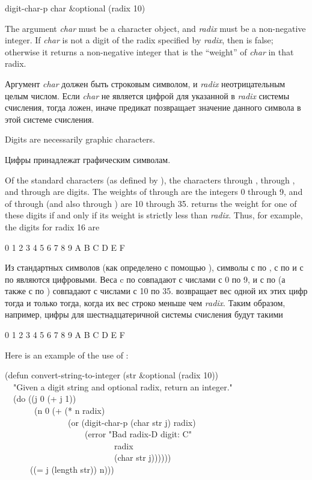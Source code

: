 \begin{defun}[Function]
digit-char-p char &optional (radix 10)

The argument \emph{char} must be a character object,
and \emph{radix} must be a non-negative integer.
If \emph{char} is not a digit of the radix
specified by \emph{radix}, then  is
false; otherwise it returns
a non-negative integer that is the ``weight'' of \emph{char} in that radix.

Аргумент \emph{char} должен быть строковым символом, и \emph{radix}
неотрицательным целым числом.
Если \emph{char} не является цифрой для указанной в \emph{radix} системы
счисления, тогда  ложен, иначе предикат позвращает значение
данного символа в этой системе счисления.

Digits are necessarily graphic characters.

Цифры принадлежат графическим символам.

Of the standard characters (as defined by ),
the characters  through ,  through ,
and  through 
are digits.  The weights of  through  are the integers 0 through 9,
and of  through  (and also  through ) are 10 through 35.
 returns the weight for one of these digits if and only if
its weight is strictly less than \emph{radix}.  Thus, for example,
the digits for radix 16 are
\begin{lisp}
0  1  2  3  4  5  6  7  8  9  A  B  C  D  E  F
\end{lisp}

Из стандартных символов (как определено с помощью ),
символы с  по , с  по  и с  по  являются
цифровыми. Веса c  по  совпадают с числами с 0 по 9, и с  по
 (а также с  по ) совпадают с числами с 10 по 35.
 возвращает вес одной их этих цифр тогда и только тогда, когда
их вес строко меньше чем \emph{radix}. Таким образом, например, цифры для
шестнадцатеричной системы счисления будут такими
\begin{lisp}
0  1  2  3  4  5  6  7  8  9  A  B  C  D  E  F
\end{lisp}

Here is an example of the use of :
\begin{lisp}
(defun convert-string-to-integer (str \&optional (radix 10)) \\
~~"Given a digit string and optional radix, return an integer." \\
~~(do ((j 0 (+ j 1)) \\
~~~~~~~(n 0 (+ (* n radix) \\
~~~~~~~~~~~~~~~(or (digit-char-p (char str j) radix) \\
~~~~~~~~~~~~~~~~~~~(error "Bad radix-{\Xtilde}D digit: {\Xtilde}C" \\
~~~~~~~~~~~~~~~~~~~~~~~~~~radix \\
~~~~~~~~~~~~~~~~~~~~~~~~~~(char str j)))))) \\
~~~~~~((= j (length str)) n)))
\end{lisp}


\end{defun}
